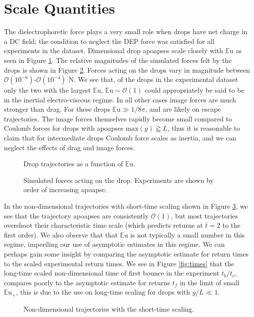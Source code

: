 \documentclass[10pt,a4paper]{article}
\begin{document}
\section{Scale Quantities}
The dielectrophoretic force plays a very small role when drops have net charge in a DC field; the condition to neglect the DEP force was satisfied for all experiments in the dataset. Dimensional drop apoapses scale closely with $\mathbb{E}\mbox{u}$ as seen in Figure \ref{fig:series_s_eu}. The relative magnitudes of the simulated forces felt by the drops is shown in Figure \ref{fig:forces}. Forces acting on the drops vary in magnitude between $\mathcal{O}(10^{-6})$-$\mathcal{O}(10^{-4})$ N. We see that, of the drops in the experimental dataset only the two with the largest $\mathbb{E}\mbox{u}$, $\mathbb{E}\mbox{u} \sim \mathcal{O}(1)$ could appropriately be said to be in the inertial electro-viscous regime. In all other cases image forces are much stronger than drag. For these drops $\mathbb{E}\mbox{u} \gg 1/8 \pi$, and are likely on escape trajectories. The image forces themselves rapidly become small compared to Coulomb forces for drops with apoapses $\mbox{max}\left( y\right) \gtrapprox L$, thus it is reasonable to claim that for intermediate drops Coulomb force scales as inertia, and we can neglect the effects of drag and image forces.

\begin{figure}[!htb]
    \centering
    
    \caption{Drop trajectories as a function of $\mathbb{E}\mbox{u}$.\label{fig:series_s_eu}}
\end{figure}
\begin{figure}[!htb]
    \centering
    \resizebox{14cm}{!}{}
    \caption{Simulated forces acting on the drop. Experiments are shown by order of increasing apoapse.\label{fig:forces}}
\end{figure}

In the non-dimensional trajectories with short-time scaling shown in Figure \ref{fig:series_s_ds}, we see that the trajectory apoapses are consistently $\mathcal{O}(1)$, but most trajectories overshoot their characteristic time scale (which predicts returns at $\bar{t}  =2$ to the first order). We also observe that that $\mathbb{E}\mbox{u}$ is not typically a small number in this regime, imperiling our use of asymptotic estimates in this regime. We can perhaps gain some insight by comparing the asymptotic estimate for return times to the scaled experimental return times. We see in Figure \ref{fig:times} that the long-time scaled non-dimensional time of first bounce in the experiment $t_b / t_c$, compares poorly to the asymptotic estimate for returns $t_f$ in the limit of small $\mathbb{E}\mbox{u}_+$, this is due to the use on long-time scaling for drops with $y/L \ll 1$.   
\begin{figure}[H]
    \centering
    
    \caption{Non-dimensional trajectories with the short-time scaling.\label{fig:series_s_ds}}
\end{figure}
\end{document}
